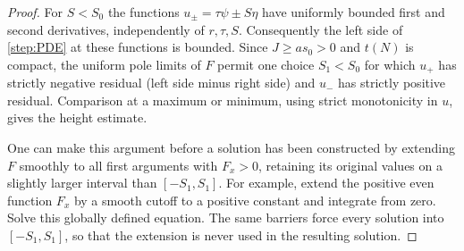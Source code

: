 \begin{proof}
For $S<S_0$ the functions $u_\pm=\tau\psi\pm S\eta$ have uniformly
bounded first and second derivatives, independently of $r,\tau,S$.
Consequently the left side of \cref{step:PDE} at these functions is
bounded.  Since $J\ge as_0>0$ and $t(N)$ is compact, the uniform pole
limits of $F$ permit one choice $S_1<S_0$ for which $u_+$ has strictly
negative residual (left side minus right side) and $u_-$ has strictly
positive residual.  Comparison at a maximum or minimum, using strict
monotonicity in $u$, gives the height estimate.

One can make this argument before a solution has been constructed by
extending $F$ smoothly to all first arguments with $F_x>0$, retaining its
original values on a slightly larger interval than $[-S_1,S_1]$.  For
example, extend the positive even function $F_x$ by a smooth cutoff to a
positive constant and integrate from zero.  Solve this globally defined
equation.  The same barriers force every solution into $[-S_1,S_1]$, so
that the extension is never used in the resulting solution.


\end{proof}
